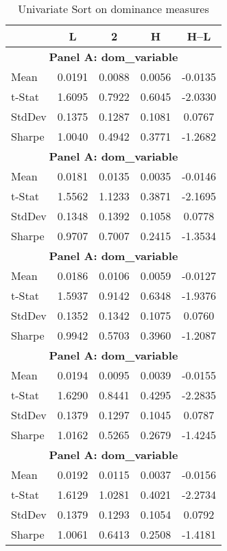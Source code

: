 \begin{table}[ht]
\centering
\caption{Univariate Sort on dominance measures}
\label{tab:univariate_sort}

\begin{tabular}{lcccc}
\toprule
       & L    & 2    & H    & H--L \\
\midrule

\multicolumn{5}{c}{\textbf{Panel A: {dom_variable}}} \\
\midrule
Mean & 0.0191 & 0.0088 & 0.0056 & -0.0135 \\
t-Stat & 1.6095 & 0.7922 & 0.6045 & -2.0330 \\
StdDev & 0.1375 & 0.1287 & 0.1081 & 0.0767 \\
Sharpe & 1.0040 & 0.4942 & 0.3771 & -1.2682 \\
\midrule

\multicolumn{5}{c}{\textbf{Panel A: {dom_variable}}} \\
\midrule
Mean & 0.0181 & 0.0135 & 0.0035 & -0.0146 \\
t-Stat & 1.5562 & 1.1233 & 0.3871 & -2.1695 \\
StdDev & 0.1348 & 0.1392 & 0.1058 & 0.0778 \\
Sharpe & 0.9707 & 0.7007 & 0.2415 & -1.3534 \\
\midrule

\multicolumn{5}{c}{\textbf{Panel A: {dom_variable}}} \\
\midrule
Mean & 0.0186 & 0.0106 & 0.0059 & -0.0127 \\
t-Stat & 1.5937 & 0.9142 & 0.6348 & -1.9376 \\
StdDev & 0.1352 & 0.1342 & 0.1075 & 0.0760 \\
Sharpe & 0.9942 & 0.5703 & 0.3960 & -1.2087 \\
\midrule

\multicolumn{5}{c}{\textbf{Panel A: {dom_variable}}} \\
\midrule
Mean & 0.0194 & 0.0095 & 0.0039 & -0.0155 \\
t-Stat & 1.6290 & 0.8441 & 0.4295 & -2.2835 \\
StdDev & 0.1379 & 0.1297 & 0.1045 & 0.0787 \\
Sharpe & 1.0162 & 0.5265 & 0.2679 & -1.4245 \\
\midrule

\multicolumn{5}{c}{\textbf{Panel A: {dom_variable}}} \\
\midrule
Mean & 0.0192 & 0.0115 & 0.0037 & -0.0156 \\
t-Stat & 1.6129 & 1.0281 & 0.4021 & -2.2734 \\
StdDev & 0.1379 & 0.1293 & 0.1054 & 0.0792 \\
Sharpe & 1.0061 & 0.6413 & 0.2508 & -1.4181 \\
\midrule


\end{tabular}
\end{table}
